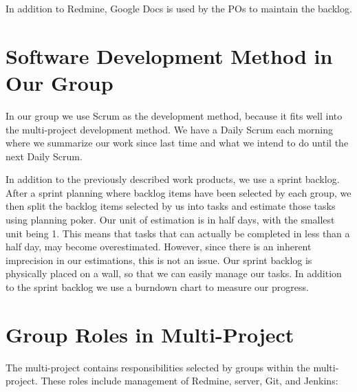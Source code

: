 In addition to Redmine, Google Docs is used by the POs to maintain the backlog.

\section{Software Development Method in Our Group}\label{sec:swmethod_ourgroup}
In our group we use Scrum as the development method, because it fits well into the multi-project development method. We have a Daily Scrum each morning where we summarize our work since last time and what we intend to do until the next Daily Scrum.

In addition to the previously described work products, we use a sprint backlog. After a sprint planning where backlog items have been selected by each group, we then split the backlog items selected by us into tasks and estimate those tasks using planning poker. Our unit of estimation is in half days, with the smallest unit being 1. This means that tasks that can actually be completed in less than a half day, may become overestimated. However, since there is an inherent imprecision in our estimations, this is not an issue. Our sprint backlog is physically placed on a wall, so that we can easily manage our tasks. In addition to the sprint backlog we use a burndown chart to measure our progress.


\section{Group Roles in Multi-Project}\label{sec:multi_project_group_roles}
The multi-project contains responsibilities selected by groups within the multi-project. These roles include management of Redmine, server, Git, and Jenkins:

